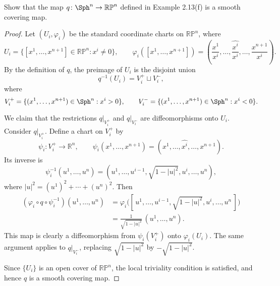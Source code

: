 \begin{problem}
    Show that the map $q \colon \Sph^n \to \mathbb{RP}^n$ defined in Example 2.13(f) is a 
    smooth covering map.
    \begin{proof}
        Let $(U_i,\varphi_i)$ be the standard coordinate charts on $\mathbb{RP}^n$, where
        \[
        U_i = \{[x^1,\dots,x^{n+1}] \in \mathbb{RP}^n : x^i \neq 0\}, \qquad
        \varphi_i([x^1,\dots,x^{n+1}]) = \left(\frac{x^1}{x^i}, \dots, \widehat{\frac{x^i}{x^i}}, \dots, \frac{x^{n+1}}{x^i}\right).
        \]
        By the definition of $q$, the preimage of $U_i$ is the disjoint union
        \[
        q^{-1}(U_i) = V_i^+ \sqcup V_i^-,
        \]
        where
        \[
        V_i^+ = \{(x^1,\dots,x^{n+1}) \in \Sph^n : x^i>0\}, \qquad
        V_i^- = \{(x^1,\dots,x^{n+1}) \in \Sph^n : x^i<0\}.
        \]

        We claim that the restrictions $q|_{V_i^+}$ and $q|_{V_i^-}$ are diffeomorphisms onto $U_i$.  
        Consider $q|_{V_i^+}$. Define a chart on $V_i^+$ by
        \[
        \psi_i \colon V_i^+ \to \mathbb{R}^n, \qquad
        \psi_i(x^1,\dots,x^{n+1}) = (x^1,\dots,\widehat{x^i},\dots,x^{n+1}).
        \]
        Its inverse is
        \[
        \psi_i^{-1}(u^1,\dots,u^n) = (u^1,\dots,u^{i-1},\sqrt{1-|u|^2},u^i,\dots,u^n),
        \]
        where $|u|^2=(u^1)^2+\cdots+(u^n)^2$. Then
        \begin{align*}
        (\varphi_i \circ q \circ \psi_i^{-1})(u^1,\dots,u^n)
        &= \varphi_i\bigl([\,u^1,\dots,u^{i-1},\sqrt{1-|u|^2},u^i,\dots,u^n\,]\bigr) \\
        &= \frac{1}{\sqrt{1-|u|^2}}\,(u^1,\dots,u^n).
        \end{align*}
        This map is clearly a diffeomorphism from $\psi_i(V_i^+)$ onto $\varphi_i(U_i)$.  
        The same argument applies to $q|_{V_i^-}$, replacing $\sqrt{1-|u|^2}$ by $-\sqrt{1-|u|^2}$.

        Since $\{U_i\}$ is an open cover of $\mathbb{RP}^n$, the local triviality condition is satisfied, and hence $q$ is a smooth covering map.
    \end{proof}
\end{problem}

